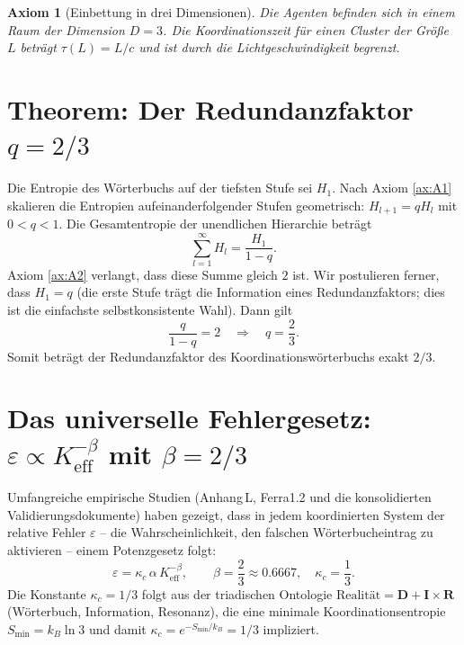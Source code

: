 \documentclass[12pt,a4paper]{article}
\newtheorem{axiom}{Axiom}
\begin{document}
	\begin{axiom}[Einbettung in drei Dimensionen] \label{ax:A3}
		Die Agenten befinden sich in einem Raum der Dimension \(D = 3\).  Die Koordinationszeit für einen Cluster der Größe \(L\) beträgt \(\tau(L) = L/c\) und ist durch die Lichtgeschwindigkeit begrenzt.
	\end{axiom}
	
	
	\section{Theorem: Der Redundanzfaktor \(q = 2/3\)}
	
	Die Entropie des Wörterbuchs auf der tiefsten Stufe sei \(H_1\).  Nach Axiom \ref{ax:A1} skalieren die Entropien aufeinanderfolgender Stufen geometrisch: \(H_{l+1} = q H_l\) mit \(0 < q < 1\).  Die Gesamtentropie der unendlichen Hierarchie beträgt
	\[
	\sum_{l=1}^{\infty} H_l = \frac{H_1}{1-q}.
	\]
	Axiom \ref{ax:A2} verlangt, dass diese Summe gleich \(2\) ist.  Wir postulieren ferner, dass \(H_1 = q\) (die erste Stufe trägt die Information eines Redundanzfaktors; dies ist die einfachste selbstkonsistente Wahl).  Dann gilt
	\begin{equation}
		\frac{q}{1-q} = 2 \quad\Longrightarrow\quad \boxed{q = \frac{2}{3}}.
		\label{eq:q}
	\end{equation}
	Somit beträgt der Redundanzfaktor des Koordinationswörterbuchs exakt \(2/3\).
	
	\section{Das universelle Fehlergesetz: \(\varepsilon \propto K_{\mathrm{eff}}^{-\beta}\) mit \(\beta = 2/3\)}
	
	Umfangreiche empirische Studien (Anhang L, Ferra1.2 und die konsolidierten Validierungsdokumente) haben gezeigt, dass in jedem koordinierten System der relative Fehler \(\varepsilon\) – die Wahrscheinlichkeit, den falschen Wörterbucheintrag zu aktivieren – einem Potenzgesetz folgt:
	\begin{equation}
		\boxed{\varepsilon = \kappa_c \, \alpha \, K_{\mathrm{eff}}^{-\beta}, \qquad \beta = \frac{2}{3} \approx 0.6667,\quad \kappa_c = \frac{1}{3}}.
		\label{eq:error-law}
	\end{equation}
	Die Konstante \(\kappa_c = 1/3\) folgt aus der triadischen Ontologie \(\text{Realität} = \mathbf{D} + \mathbf{I} \times \mathbf{R}\) (Wörterbuch, Information, Resonanz), die eine minimale Koordinationsentropie \(S_{\min} = k_B \ln 3\) und damit \(\kappa_c = e^{-S_{\min}/k_B} = 1/3\) impliziert.
	
\end{document}
